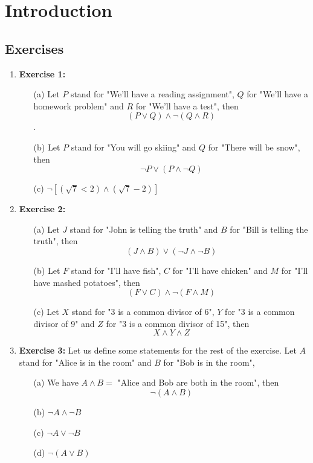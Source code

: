\documentclass{article} %
\begin{document}
    \section*{Introduction} %
    
    \subsection*{Exercises} %
    
    \begin{enumerate}
        \item \textbf{Exercise 1:}
        \begin{itemize}
            \item[(a)] Let \(P\) stand for "We'll have a reading assignment", \(Q\) for "We'll have a homework problem" and \(R\) for "We'll have a test", then \[(P \vee Q) \wedge \neg (Q \wedge R)\].
            \item[(b)] Let \(P\) stand for "You will go skiing" and \(Q\) for "There will be snow", then \[\neg P \vee (P \wedge \neg Q)\]
            \item[(c)] \( \neg [(\sqrt{7} < 2) \wedge (\sqrt{7} - 2)] \)
        \end{itemize} 

        \item \textbf{Exercise 2:}
        \begin{itemize}
            \item[(a)] Let \(J\) stand for "John is telling the truth" and \(B\) for "Bill is telling the truth", then \[(J \wedge B) \vee (\neg J \wedge \neg B)\]
            \item[(b)] Let \(F\) stand for "I'll have fish", \(C\) for "I'll have chicken" and \(M\) for "I'll have mashed potatoes", then \[(F \vee C) \wedge \neg (F \wedge M)\]
            \item[(c)] Let \(X\) stand for "3 is a common divisor of 6", \(Y\) for "3 is a common divisor of 9" and \(Z\) for "3 is a common divisor of 15", then \[X \wedge Y \wedge Z\]
        \end{itemize}

        \item \textbf{Exercise 3:}
        Let us define some statements for the rest of the exercise. Let \(A\) stand for "Alice is in the room" and \(B\) for "Bob is in the room",
        \begin{itemize}
            \item[(a)] We have \(A \wedge B = \) "Alice and Bob are both in the room", then \[\neg (A \wedge B)\]
            \item[(b)] \(\neg A \wedge \neg B\)
            \item[(c)] \(\neg A \vee \neg B\)
            \item[(d)] \(\neg (A \vee B)\)
        \end{itemize}


\end{enumerate}
\end{document}
